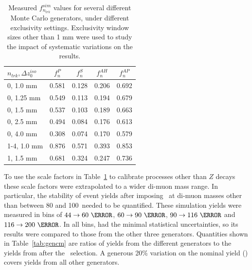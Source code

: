\begin{table}[h]
\begin{center}
\begin{tabular}{|l|cccc|}
\hline
$n_{trk},  \Delta z^{iso}_0$ & $f^P_n$ & $f^S_n$ & $f^{AH}_n$ & $f^{AP}_n$ \\
\hline\hline
0, 1.0 mm & 0.581 & 0.128 & 0.206 & 0.692 \\
0, 1.25 mm & 0.549 & 0.113 & 0.194 & 0.679 \\
0, 1.5 mm & 0.537 & 0.103 & 0.189 & 0.663 \\
0, 2.5 mm & 0.494 & 0.084 & 0.176 & 0.613 \\
0, 4.0 mm & 0.308 & 0.074 & 0.170 & 0.579\\
1-4, 1.0 mm & 0.876 & 0.571 & 0.393 & 0.853 \\
1, 1.5 mm & 0.681 & 0.324 & 0.247 & 0.736 \\
\hline
\end{tabular}
\caption{Measured $f^{sim}_{n_{trk}}$ values for several different Monte Carlo generators, under different exclusivity 
settings. Exclusivity window sizes other than 1 mm were used to study the impact of systematic variations on the results.} 
\label{tbl:rejscale}
\end{center}
\end{table}

\par To use the scale factors in Table~\ref{tbl:rejscale} to calibrate processes other than $Z$ decays 
these scale factors were extrapolated to a wider di-muon mass range. In particular, the stability of event
yields after imposing \DZ\ at di-muon masses other than between 80 and 100~\GeV needed to be quantified. These simulation yields 
 were measured in bins of $44\to60~\GeV$, $60\to90~\GeV$, $90\to116~\GeV$ and $116\to200~\GeV$. In all bins, \SHERPA had the 
minimal statistical uncertainties, so its results were compared to those from the other three generators. Quantities 
shown in Table~\ref{tab:gencm} are ratios of yields from the different generators to the yields from \SHERPA after 
the \DZ\ selection. A generous 20\% variation on the nominal yield (\SHERPA) covers yields from all other 
generators.  

